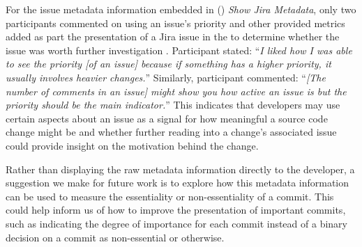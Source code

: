 For the issue metadata information embedded in () \textit{Show Jira Metadata},
only two participants commented on using an issue's priority and other provided metrics added as part  the presentation
of a Jira issue in the  to determine whether the issue was worth further investigation .
Participant  stated: 
``\textit{I liked how I was able to see the priority [of an issue] because if something has a higher priority, it usually involves heavier changes.}''
Similarly, participant  commented:
``\textit{[The number of comments in an issue] might show you how active an issue is but the priority should be the main indicator.}''
This indicates that developers may use certain aspects about an issue as a signal 
for how meaningful a source code change might be and whether further reading into a change's associated issue
could provide insight on the motivation behind the change.

Rather than displaying the raw metadata information directly to the developer,
a suggestion we make for future work is to explore how this metadata information
can be used to measure the essentiality or non-essentiality of a commit.
This could help inform us of how to improve the presentation of important
commits, such as indicating the degree of importance for each commit 
instead of a binary decision on a commit as non-essential or otherwise.

\endinput

Any text after an \endinput is ignored.
You could put scraps here or things in progress.